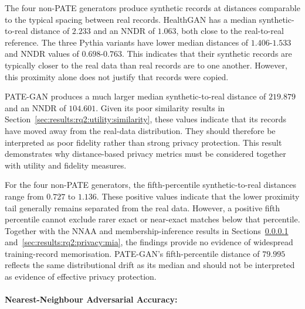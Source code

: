 \begin{table}[H]
\centering
\small
\caption{Median and fifth-percentile nearest-neighbour distances and
median NNDR for each generator. The fifth-percentile synthetic-to-real
distance describes the lower proximity tail. The median real-to-real
nearest-neighbour distance is $2.019$ and is included as a descriptive
reference. Larger synthetic-to-real distances and
$\text{NNDR} \geq 1$ suggest lower proximity risk only when the
synthetic data also preserve the real-data distribution.}
\label{tab:rq2:nn}

\end{table}

The four non-PATE generators produce synthetic records at distances
comparable to the typical spacing between real records. HealthGAN has
a median synthetic-to-real distance of $2.233$ and an NNDR of $1.063$,
both close to the real-to-real reference. The three Pythia variants
have lower median distances of $1.406$-$1.533$ and NNDR values of
$0.698$-$0.763$. This indicates that their synthetic records are
typically closer to the real data than real records are to one another.
However, this proximity alone does not justify that records were
copied.

PATE-GAN produces a much larger median synthetic-to-real distance of
$219.879$ and an NNDR of $104.601$. Given its poor similarity results
in Section~\ref{sec:results:rq2:utility:similarity}, these values indicate
that its records have moved away from the real-data distribution. They
should therefore be interpreted as poor fidelity rather than strong
privacy protection. This result demonstrates why distance-based privacy
metrics must be considered together with utility and fidelity measures.

For the four non-PATE generators, the fifth-percentile
synthetic-to-real distances range from $0.727$ to $1.136$. These
positive values indicate that the lower proximity tail generally
remains separated from the real data. However, a positive fifth
percentile cannot exclude rarer exact or near-exact matches below that
percentile. Together with the NNAA and membership-inference results in
Sections~\ref{sec:results:rq2:privacy:nnaa}
and~\ref{sec:results:rq2:privacy:mia}, the findings provide no evidence
of widespread training-record memorisation. PATE-GAN's
fifth-percentile distance of $79.995$ reflects the same distributional
drift as its median and should not be interpreted as evidence of
effective privacy protection.

\paragraph{Nearest-Neighbour Adversarial Accuracy:}
\label{sec:results:rq2:privacy:nnaa}

